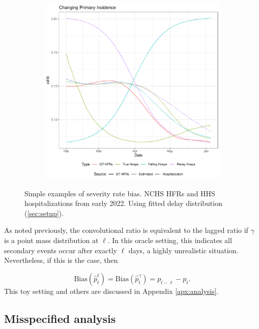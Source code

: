 \documentclass{article}
\begin{document}
\begin{figure}
\begin{subfigure}[b]{0.32\linewidth}
         \caption{}
         \label{fig:toy_delay}
     \end{subfigure}
     \begin{subfigure}[b]{0.32\linewidth}
         \centering
         \includegraphics[width=\linewidth]{Figs/Simulated/toy_chging_primary.pdf}
         \caption{}
         \label{fig:toy_primary}
     \end{subfigure}
        \caption{Simple examples of severity rate bias. NCHS HFRs and HHS hospitalizations from early 2022. Using fitted delay distribution (\ref{sec:setup}).}
        \label{fig:bias_ex_main}
\end{figure}


As noted previously, the convolutional ratio is equivalent to the lagged ratio if $\gamma$ is a point mass distribution at $\ell$. In this oracle setting, this indicates all secondary events occur after exactly $\ell$ days, a highly unrealistic situation. Nevertheless, if this is the case, then 

$$\text{Bias}(\hat{p}_t^\ell) = \text{Bias}(\hat{p}_t^\gamma) = p_{t-\ell}-p_t.$$
\noindent This toy setting and others are discussed in Appendix \ref{apx:analysis}.

\subsection{Misspecified analysis}
\end{document}
